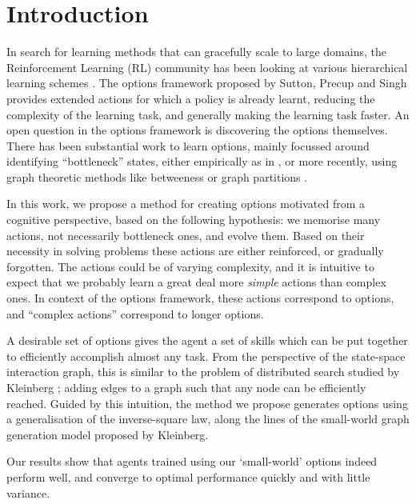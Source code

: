 \section{Introduction}
\label{sec:intro}

In search for learning methods that can gracefully scale to large domains, the
Reinforcement Learning (RL) community has been looking at various hierarchical
learning schemes \cite{BartoMahadevan}. The options framework proposed by
Sutton, Precup and Singh \cite{Sutton1998} provides extended actions for which a
policy is already learnt, reducing the complexity of the learning task, and
generally making the learning task faster. An open question in the options
framework is discovering the options themselves. There has been substantial work
to learn options, mainly focussed around identifying ``bottleneck'' states,
either empirically as in \cite{Stolle}, or more recently, using graph
theoretic methods like betweeness \cite{Simsek} or graph partitions
\cite{Simsek2005}.

In this work, we propose a method for creating options motivated from a
cognitive perspective, based on the following hypothesis: we memorise many
actions, not necessarily bottleneck ones, and evolve them. Based on their
necessity in solving problems these actions are either reinforced, or gradually
forgotten. The actions could be of varying complexity, and it is intuitive to
expect that we probably learn a great deal more {\em simple} actions than
complex ones. In context of the options framework, these actions correspond to
options, and ``complex actions'' correspond to longer options.

A desirable set of options gives the agent a set of skills which can be put
together to efficiently accomplish almost any task. From the perspective of the
state-space interaction graph, this is similar to the problem of distributed
search studied by Kleinberg \cite{Kleinberg}; adding edges to a graph such that
any node can be efficiently reached. Guided by this intuition, the method we
propose generates options using a generalisation of the inverse-square law,
along the lines of the small-world graph generation model proposed by Kleinberg.

Our results show that agents trained using our `small-world' options indeed
perform well, and converge to optimal performance quickly and with little
variance. 

